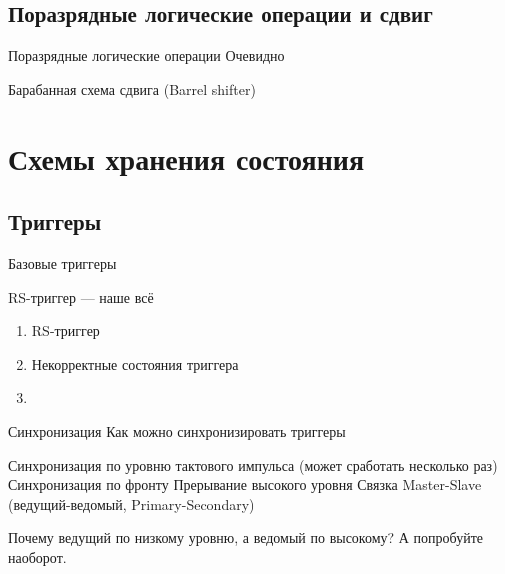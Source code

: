 \documentclass[xetex,aspectratio=43]{beamer}
\begin{document}
\subsection{Поразрядные логические операции и сдвиг}

\begin{frame}{Поразрядные логические операции}
    Очевидно
\end{frame}

\begin{frame}{Барабанная схема сдвига (Barrel shifter)}
    \begin{figure}
        
    \end{figure}
\end{frame}

\section{Схемы хранения состояния}

\subsection{Триггеры}

\begin{frame}{Базовые триггеры}
\end{frame}

\begin{frame}{RS-триггер --- наше всё}
    \begin{enumerate}
        \tightlist
        \item
        RS-триггер
        \item
        Некорректные состояния триггера
        \item
    \end{enumerate}
\end{frame}

\begin{frame}{Синхронизация}
    Как можно синхронизировать триггеры
    \begin{outline}[itemize]
        \tightlist
        \1
        Синхронизация по уровню тактового импульса (может сработать несколько раз)
        \1
        Синхронизация по фронту
        \2 Прерывание высокого уровня
        \2 Связка Master-Slave (ведущий-ведомый, Primary-Secondary)
    \end{outline}

    \pause

    Почему ведущий по низкому уровню, а ведомый по высокому? А попробуйте наоборот.

\end{frame}
\end{document}
